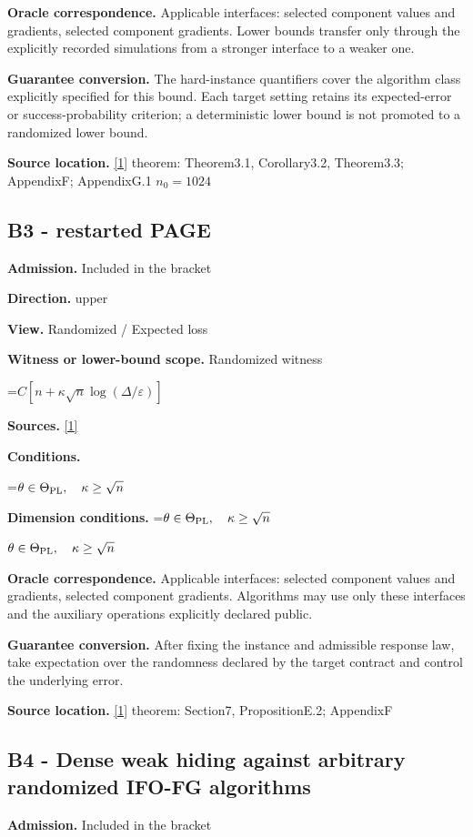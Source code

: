 \documentclass[10pt,a4paper]{article}
\newcommand{\AtlasMath}[1]{\par\begingroup\centering\setbox0=\hbox{$\displaystyle #1$}\ifdim\wd0>1.4\linewidth\typeout{ATLAS WIDE FORMULA: \the\wd0}\fi\ifdim\wd0>\linewidth\resizebox{\linewidth}{!}{\box0}\else\box0\fi\par\endgroup}
\newcommand{\AtlasInlineMath}[1]{\begingroup\setbox0=\hbox{$#1$}\ifdim\wd0>.4\linewidth\endgroup\AtlasMath{#1}\else\endgroup$#1$\fi}
\begin{document}
\textbf{Oracle correspondence.} Applicable interfaces: selected component values and gradients, selected component gradients. Lower bounds transfer only through the explicitly recorded simulations from a stronger interface to a weaker one.

\textbf{Guarantee conversion.} The hard-instance quantifiers cover the algorithm class explicitly specified for this bound. Each target setting retains its expected-error or success-probability criterion; a deterministic lower bound is not promoted to a randomized lower bound.

\textbf{Source location.} \href{https://arxiv.org/pdf/2609.00045v3}{[1]} theorem: Theorem3.1, Corollary3.2, Theorem3.3; AppendixF; AppendixG.1 $n_0=1024$

\subsection{B3 - restarted PAGE}
\textbf{Admission.} Included in the bracket

\textbf{Direction.} upper

\textbf{View.} Randomized / Expected loss

\textbf{Witness or lower-bound scope.} Randomized witness

\AtlasMath{C[n+\kappa\sqrt n\log(\Delta/\varepsilon)]}
\textbf{Sources.} \href{https://arxiv.org/pdf/2609.00045v3}{[1]}

\textbf{Conditions.} 
\AtlasMath{\theta\in\Theta_{\rm PL},\quad\kappa\ge\sqrt n}


\textbf{Dimension conditions.} \AtlasInlineMath{\theta\in\Theta_{\rm PL},\quad\kappa\ge\sqrt n}

\textbf{Oracle correspondence.} Applicable interfaces: selected component values and gradients, selected component gradients. Algorithms may use only these interfaces and the auxiliary operations explicitly declared public.

\textbf{Guarantee conversion.} After fixing the instance and admissible response law, take expectation over the randomness declared by the target contract and control the underlying error.

\textbf{Source location.} \href{https://arxiv.org/pdf/2609.00045v3}{[1]} theorem: Section7, PropositionE.2; AppendixF

\subsection{B4 - Dense weak hiding against arbitrary randomized IFO-FG algorithms}
\textbf{Admission.} Included in the bracket
\end{document}
